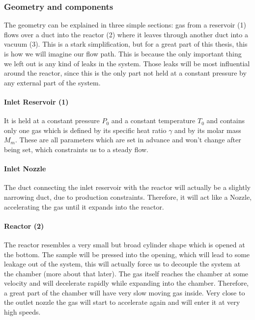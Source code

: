 \subsubsection{Geometry and components}
The geometry can be explained in three simple sections: gas from a reservoir (1) flows over a duct into the reactor (2) where it leaves through another duct into a vacuum (3). This is a stark simplification, but for a great part of this thesis, this is how we will imagine our flow path. This is because the only important thing we left out is any kind of leaks in the system. Those leaks will be most influential around the reactor, since this is the only part not held at a constant pressure by any external part of the system.\\


\paragraph{Inlet Reservoir (1)}
It is held at a constant pressure \(P_0\) and a constant temperature \(T_0\) and contains only one gas which is defined by its specific heat ratio \(\gamma\) and by its molar mass \(M_m\). These are all parameters which are set in advance and won't change after being set, which constraints us to a steady flow.

\paragraph{Inlet Nozzle}
The duct connecting the inlet reservoir with the reactor will actually be a slightly narrowing duct, due to production constraints. Therefore, it will act like a Nozzle, accelerating the gas until it expands into the reactor.

\paragraph{Reactor (2)}
The reactor resembles a very small but broad cylinder shape which is opened at the bottom. The sample will be pressed into the opening, which will lead to some leakage out of the system, this will actually force us to decouple the system at the chamber (more about that later). The gas itself reaches the chamber at some velocity and will decelerate rapidly while expanding into the chamber. Therefore, a great part of the chamber will have very slow moving gas inside. Very close to the outlet nozzle the gas will start to accelerate again and will enter it at very high speeds.

